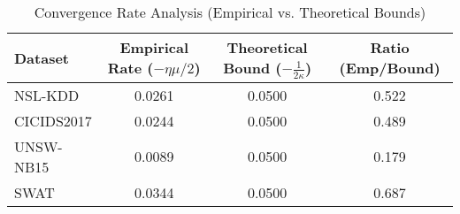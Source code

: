 \begin{table}[t]
\centering
\caption{Convergence Rate Analysis (Empirical vs. Theoretical Bounds)}
\label{tab:convergence}
\begin{tabular}{@{}lccc@{}}
\toprule
\textbf{Dataset} & \textbf{Empirical Rate ($-\eta\mu/2$)} & \textbf{Theoretical Bound ($-\frac{1}{2\kappa}$)} & \textbf{Ratio (Emp/Bound)} \\
\midrule
NSL-KDD & 0.0261 & 0.0500 & 0.522 \\
CICIDS2017 & 0.0244 & 0.0500 & 0.489 \\
UNSW-NB15 & 0.0089 & 0.0500 & 0.179 \\
SWAT & 0.0344 & 0.0500 & 0.687 \\
\bottomrule
\end{tabular}
\end{table}
